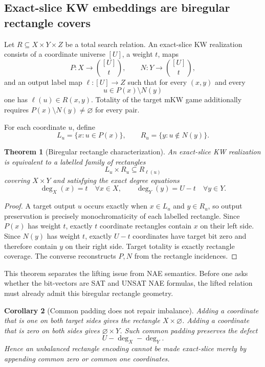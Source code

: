 \documentclass[11pt]{article}
\newtheorem{theorem}{Theorem}
\newtheorem{corollary}[theorem]{Corollary}
\begin{document}
\subsection{Exact-slice KW embeddings are biregular rectangle covers}
Let $R\subseteq X\times Y\times Z$ be a total search relation. An exact-slice KW realization consists of a coordinate universe $[U]$, a weight $t$, maps
\[
P:X\to\binom{[U]}t,\qquad N:Y\to\binom{[U]}t,
\]
and an output label map $\ell:[U]\to Z$ such that for every $(x,y)$ and every
\[
u\in P(x)\setminus N(y)
\]
one has $\ell(u)\in R(x,y)$. Totality of the target mKW game additionally requires $P(x)\setminus N(y)\ne\varnothing$ for every pair.

For each coordinate $u$, define
\[
L_u=\{x:u\in P(x)\},\qquad
R_u=\{y:u\notin N(y)\}.
\]

\begin{theorem}[Biregular rectangle characterization]
An exact-slice KW realization is equivalent to a labelled family of rectangles
\[
L_u\times R_u\subseteq R_{\ell(u)}
\]
covering $X\times Y$ and satisfying the exact degree equations
\[
\boxed{\deg_X(x)=t\quad\forall x\in X,}
\qquad
\boxed{\deg_Y(y)=U-t\quad\forall y\in Y.}
\]
\end{theorem}
\begin{proof}
A target output $u$ occurs exactly when $x\in L_u$ and $y\in R_u$, so output preservation is precisely monochromaticity of each labelled rectangle. Since $P(x)$ has weight $t$, exactly $t$ coordinate rectangles contain $x$ on their left side. Since $N(y)$ has weight $t$, exactly $U-t$ coordinates have target bit zero and therefore contain $y$ on their right side. Target totality is exactly rectangle coverage. The converse reconstructs $P,N$ from the rectangle incidences.
\end{proof}

This theorem separates the lifting issue from NAE semantics. Before one asks whether the bit-vectors are SAT and UNSAT NAE formulas, the lifted relation must already admit this biregular rectangle geometry.

\begin{corollary}[Common padding does not repair imbalance]
Adding a coordinate that is one on both target sides gives the rectangle $X\times\varnothing$. Adding a coordinate that is zero on both sides gives $\varnothing\times Y$. Such common padding preserves the defect
\[
U-\deg_X-\deg_Y.
\]
Hence an unbalanced rectangle encoding cannot be made exact-slice merely by appending common zero or common one coordinates.
\end{corollary}
\end{document}
